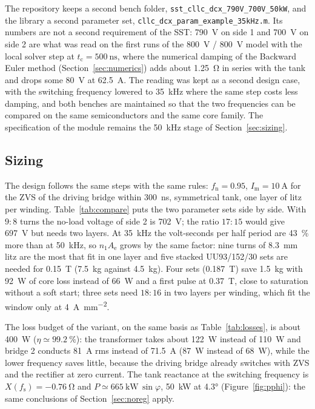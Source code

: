 \documentclass[12pt,a4paper]{scrartcl}
\newcommand{\ped}[1]{_{\mathrm{#1}}}
\newcommand{\code}[1]{\texttt{#1}}
\begin{document}
\begin{onehalfspace}
The repository keeps a second bench folder, \code{sst\_cllc\_dcx\_790V\_700V\_50kW}, and the library a second parameter set, \code{cllc\_dcx\_param\_example\_35kHz.m}. Its numbers are not a second requirement of the SST: \SI{790}{\volt} on side 1 and \SI{700}{\volt} on side 2 are what was read on the first runs of the \SI{800}{\volt} / \SI{800}{\volt} model with the local solver step at $t\ped{c} = \SI{500}{\nano\second}$, where the numerical damping of the Backward Euler method (Section~\ref{sec:numerics}) adds about \SI{1.25}{\ohm} in series with the tank and drops some \SI{80}{\volt} at \SI{62.5}{\ampere}. The reading was kept as a second design case, with the switching frequency lowered to \SI{35}{\kilo\hertz} where the same step costs less damping, and both benches are maintained so that the two frequencies can be compared on the same semiconductors and the same core family. The specification of the module remains the \SI{50}{\kilo\hertz} stage of Section~\ref{sec:sizing}.

\subsection{Sizing}
\label{sec:variant_sizing}

The design follows the same steps with the same rules: $f\ped{n} = 0.95$, $I\ped{m} = \SI{10}{\ampere}$ for the ZVS of the driving bridge within \SI{300}{\nano\second}, symmetrical tank, one layer of litz per winding. Table~\ref{tab:compare} puts the two parameter sets side by side. With $9:8$ turns the no-load voltage of side 2 is \SI{702}{\volt}; the ratio $17:15$ would give \SI{697}{\volt} but needs two layers. At \SI{35}{\kilo\hertz} the volt-seconds per half period are \SI{43}{\percent} more than at \SI{50}{\kilo\hertz}, so $n\ped{1} A\ped{e}$ grows by the same factor: nine turns of \SI{8.3}{\milli\metre} litz are the most that fit in one layer and five stacked UU93/152/30 sets are needed for \SI{0.15}{\tesla} (\SI{7.5}{\kilogram} against \SI{4.5}{\kilogram}). Four sets (\SI{0.187}{\tesla}) save \SI{1.5}{\kilogram} with \SI{92}{\watt} of core loss instead of \SI{66}{\watt} and a first pulse at \SI{0.37}{\tesla}, close to saturation without a soft start; three sets need $18:16$ in two layers per winding, which fit the window only at \SI{4}{\ampere\per\square\milli\metre}.

The loss budget of the variant, on the same basis as Table~\ref{tab:losses}, is about \SI{400}{\watt} ($\eta \simeq \SI{99.2}{\percent}$): the transformer takes about \SI{122}{\watt} instead of \SI{110}{\watt} and bridge 2 conducts \SI{81}{\ampere} rms instead of \SI{71.5}{\ampere} (\SI{87}{\watt} instead of \SI{68}{\watt}), while the lower frequency saves little, because the driving bridge already switches with ZVS and the rectifier at zero current. The tank reactance at the switching frequency is $X(f\ped{s}) = \SI{-0.76}{\ohm}$ and $P \simeq \SI{665}{\kilo\watt}\,\sin\varphi$, \SI{50}{\kilo\watt} at \ang{4.3} (Figure~\ref{fig:pphi}): the same conclusions of Section~\ref{sec:noreg} apply.


\end{onehalfspace}
\end{document}
